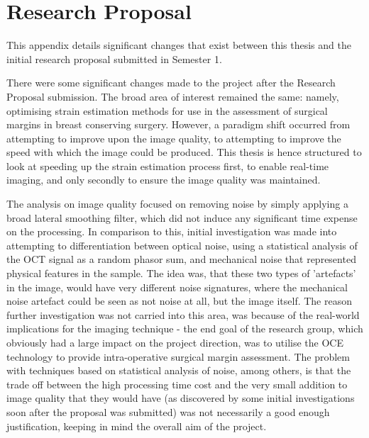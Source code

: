 \chapter{Research Proposal}

This appendix details significant changes that exist between this thesis and the initial research proposal submitted in Semester 1.

There were some significant changes made to the project after the Research Proposal submission. The broad area of interest remained the same: namely, optimising strain estimation methods for use in the assessment of surgical margins in breast conserving surgery. However, a paradigm shift occurred from attempting to improve upon the image quality, to attempting to improve the speed with which the image could be produced. This thesis is hence structured to look at speeding up the strain estimation process first, to enable real-time imaging, and only secondly to ensure the image quality was maintained.
 
The analysis on image quality focused on removing noise by simply applying a broad lateral smoothing filter, which did not induce any significant time expense on the processing. In comparison to this, initial investigation was made into attempting to differentiation between optical noise, using a statistical analysis of the OCT signal as a random phasor sum, and mechanical noise that represented physical features in the sample. The idea was, that these two types of 'artefacts' in the image, would have very different noise signatures, where the mechanical noise artefact could be seen as not noise at all, but the image itself. 
The reason further investigation was not carried into this area, was because of the real-world implications for the imaging technique - the end goal of the research group, which obviously had a large impact on the project direction, was to utilise the OCE technology to provide intra-operative surgical margin assessment. The problem with techniques based on statistical analysis of noise, among others, is that the trade off between the high processing time cost and the very small addition to image quality that they would have (as discovered by some initial investigations soon after the proposal was submitted) was not necessarily a good enough justification, keeping in mind the overall aim of the project. 


